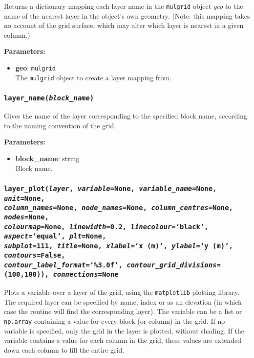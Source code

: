 Returns a dictionary mapping each layer name in the \texttt{mulgrid} object \emph{geo} to the name of the nearest layer in the object's own geometry.  (Note: this mapping takes no account of the grid surface, which may alter which layer is nearest in a given column.)

\textbf{Parameters:}
\begin{itemize}
\item \textbf{geo}: \texttt{mulgrid}\\
  The \texttt{mulgrid} object to create a layer mapping from.
\end{itemize}

\subsubsection{\texttt{layer\_name(\emph{block\_name})}}

Gives the name of the layer corresponding to the specified block name, according to the naming convention of the grid.

\textbf{Parameters:}
\begin{itemize}
\item \textbf{block\_name}: string\\
  Block name.
\end{itemize}

\subsubsection{\texttt{layer\_plot(\emph{layer}, \emph{variable}=None, \emph{variable\_name}=None, \emph{unit}=None,\\
    \emph{column\_names}=None, \emph{node\_names}=None, \emph{column\_centres}=None, \emph{nodes}=None,\\
    \emph{colourmap}=None, \emph{linewidth}=0.2, \emph{linecolour}=`black', \emph{aspect}=`equal', \emph{plt}=None,\\
    \emph{subplot}=111, \emph{title}=None, \emph{xlabel}=`x (m)', \emph{ylabel}=`y (m)', \emph{contours}=False,\\
    \emph{contour\_label\_format}=`\%3.0f', \emph{contour\_grid\_divisions}=(100,100)), \emph{connections}=None}}

Plots a variable over a layer of the grid, using the \texttt{matplotlib} plotting library.  The required layer can be specified by name, index or as an elevation (in which case the routine will find the corresponding layer).  The variable can be a list or \texttt{np.array} containing a value for every block (or column) in the grid.  If no variable is specified, only the grid in the layer is plotted, without shading.  If the variable contains a value for each column in the grid, these values are extended down each column to fill the entire grid.

